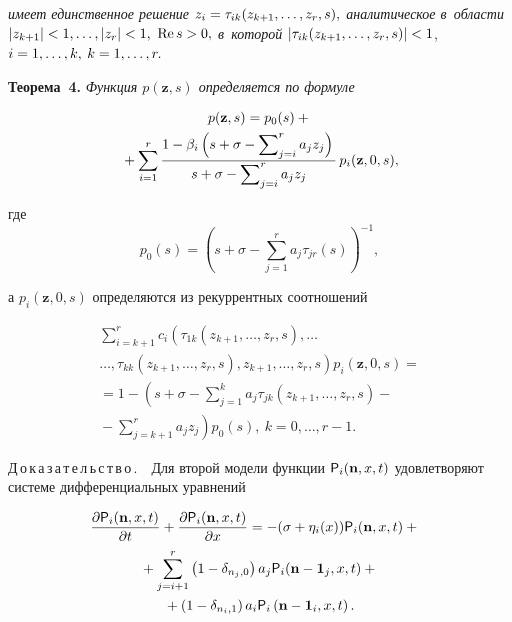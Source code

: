 \begin{multicols}{2}
\noindent
\textit{имеет единственное решение $z_i\hm=\tau_{ik}(z_{k+1},\ldots,z_r,s),$ аналитическое в~об\-ласти
$|z_{k+1}|\hm<1,\ldots,|z_r|\hm<1,$ $\mathrm{Re}\,s\hm>0,$ в~которой} $\left|\tau_{ik}(z_{k+1},\ldots,z_r,s)\right|\hm<1$, $i\hm=1,\ldots,k,$
$k\hm=1,\ldots,r.$


\smallskip

\noindent
\textbf{Теорема~4.} \textit{Функция $p(\mathbf{z},s)$ определяется по формуле}

\vspace*{-3pt}

\noindent
\begin{multline*}
p(\mathbf{z},s)=p_0(s)+{}\\
{}+\sum\limits_{i=1}^r \displaystyle\frac{\displaystyle 1-\beta_i\left(s+\sigma-\sum\nolimits_{j=i}^r a_j z_j\right)\mathstrut}{\displaystyle s+\sigma-\sum\nolimits_{j=i}^ra_jz_j\mathstrut}\,
p_i(\mathbf{z},0,s),
\end{multline*}

\vspace*{-3pt}

\noindent
где
\begin{equation*}
p_0(s)=\left(s+\sigma-\sum\limits_{j=1}^r a_j \tau_{jr}(s)\right)^{-1},
\end{equation*}

\vspace*{-3pt}

\noindent
а $p_i(\mathbf{z},0,s)$ определяются из рекуррентных соотношений

\vspace*{-3pt}

\noindent
\begin{multline*}
\!\!\sum\limits_{i=k+1}^r \! c_i\left(\tau_{1k}(z_{k+1},\ldots,z_r,s),\ldots\right.\\
\left.\ldots,\tau_{kk}(z_{k+1},\ldots,z_r,s),
z_{k+1},\ldots,z_r,s\right)p_i(\mathbf{z},0,s)={}\\
{}=1-\left(s+\sigma-\sum\limits_{j=1}^k a_j \tau_{jk}(z_{k+1},\ldots,z_r,s)-{}\right.\\
\left.{}-
\sum\limits_{j=k+1}^r a_j z_j\right)p_0(s),\ k=0,\ldots,r-1.
\end{multline*}


\noindent
Д\,о\,к\,а\,з\,а\,т\,е\,л\,ь\,с\,т\,в\,о\,.\ \  Для второй модели функции ${\sf P}_i(\mathbf{n},x,t)$ удовлетворяют системе дифференциальных уравнений

\vspace*{-3pt}

\noindent
\begin{multline*}
\hspace*{-2mm}\fr{\partial {\sf P}_i(\mathbf{n},x,t)}{\partial t}+\fr{\partial {\sf P}_i(\mathbf{n},x,t)}{\partial x}=-(\sigma+\eta_i(x)){\sf P}_i(\mathbf{n},x,t)+{}\\
{}+\sum\limits_{j=i+1}^r\left(1-\delta_{n_j,0}\right)a_j {\sf P}_i(\mathbf{n}-\mathbf{1}_j,x,t)+{}\\
{}+
\left(1-\delta_{n_i,1}\right) a_i {\sf P}_i \left(\mathbf{n}-\mathbf{1}_i,x,t\right).
\end{multline*}


\end{multicols}
